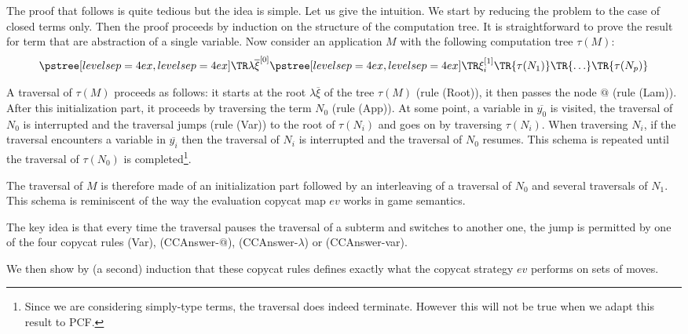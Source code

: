 \begin{rem} The proof that follows is quite tedious but the idea is simple. Let us give the intuition.
    We start by reducing the problem to the case of closed terms only. Then the proof proceeds by induction on the structure of the computation tree.
    It is straightforward to prove the result for term that are abstraction of a single variable.
    Now consider an application $M$ with the following computation tree $\tau(M)$:
    $$ \tree[levelsep=4ex]{\lambda \overline{\xi}^{[0]}}
        { \tree[levelsep=4ex]{\xi_i^{[1]}}
            {   \TR{\tau(N_1)} \TR{\ldots} \TR{\tau(N_p)}}}
    $$

    A traversal of $\tau(M)$ proceeds as follows: it starts at the root $\lambda \overline{\xi}$ of the tree $\tau(M)$ (rule
    (Root)), it then passes the node $@$ (rule (Lam)).
    After this initialization part, it proceeds by traversing the term $N_0$ (rule (App)).
    At some point, a variable in $\overline{y_0}$ is visited, the traversal
    of $N_0$ is interrupted and the traversal jumps (rule (Var)) to the root of $\tau(N_i)$ and goes on by traversing $\tau(N_i)$.
    When traversing $N_i$, if the traversal encounters a variable in $\overline{y_i}$ then the traversal of $N_i$ is interrupted and
    the traversal of $N_0$ resumes.  This schema is repeated until the traversal of $\tau(N_0)$ is completed\footnote{Since we are considering
    simply-type terms, the traversal does indeed terminate. However this will not be true when we adapt this result to PCF.}.

    The traversal of $M$ is therefore made of an initialization part followed by an interleaving of a traversal of $N_0$ and
    several traversals of $N_1$. This schema is reminiscent of the way the evaluation copycat map $ev$ works in game semantics.

    The key idea is that every time the traversal pauses the traversal of a subterm and switches to another one,
    the jump is permitted by one of the four copycat rules (Var), (CCAnswer-$@$), (CCAnswer-$\lambda$) or (CCAnswer-var).

    We then show by (a second) induction that these copycat rules defines exactly what the copycat strategy $ev$ performs on sets of moves.


\end{rem}
